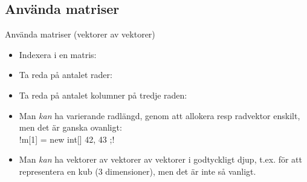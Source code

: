 \documentclass{lecturenotes}
\begin{document}
\subsection{Använda matriser}
\begin{Slide}{Använda matriser (vektorer av vektorer)}\footnotesize
\begin{itemize}
\item Indexera i en matris: \\ \vspace{1em}
\item Ta reda på antalet rader: \\ 
\item Ta reda på antalet kolumner på tredje raden: \\  
\item Man \emph{kan} ha varierande radlängd, genom att allokera resp radvektor enskilt, men det är ganska ovanligt: \\ 
   \code!m[1] = new int[] { 42, 43 };! 
\item Man \emph{kan} ha vektorer av vektorer av vektorer i godtyckligt djup, t.ex. för att representera en kub (3 dimensioner), men det är inte så vanligt. 
\end{itemize}
\end{Slide}
\end{document}
